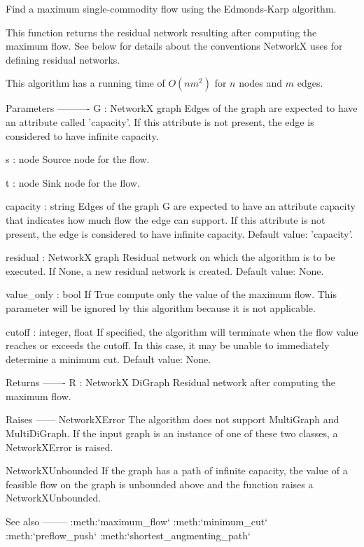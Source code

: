 \begin{DoxyVerb}Find a maximum single-commodity flow using the Edmonds-Karp algorithm.

This function returns the residual network resulting after computing
the maximum flow. See below for details about the conventions
NetworkX uses for defining residual networks.

This algorithm has a running time of $O(n m^2)$ for $n$ nodes and $m$
edges.


Parameters
----------
G : NetworkX graph
    Edges of the graph are expected to have an attribute called
    'capacity'. If this attribute is not present, the edge is
    considered to have infinite capacity.

s : node
    Source node for the flow.

t : node
    Sink node for the flow.

capacity : string
    Edges of the graph G are expected to have an attribute capacity
    that indicates how much flow the edge can support. If this
    attribute is not present, the edge is considered to have
    infinite capacity. Default value: 'capacity'.

residual : NetworkX graph
    Residual network on which the algorithm is to be executed. If None, a
    new residual network is created. Default value: None.

value_only : bool
    If True compute only the value of the maximum flow. This parameter
    will be ignored by this algorithm because it is not applicable.

cutoff : integer, float
    If specified, the algorithm will terminate when the flow value reaches
    or exceeds the cutoff. In this case, it may be unable to immediately
    determine a minimum cut. Default value: None.

Returns
-------
R : NetworkX DiGraph
    Residual network after computing the maximum flow.

Raises
------
NetworkXError
    The algorithm does not support MultiGraph and MultiDiGraph. If
    the input graph is an instance of one of these two classes, a
    NetworkXError is raised.

NetworkXUnbounded
    If the graph has a path of infinite capacity, the value of a
    feasible flow on the graph is unbounded above and the function
    raises a NetworkXUnbounded.

See also
--------
:meth:`maximum_flow`
:meth:`minimum_cut`
:meth:`preflow_push`
:meth:`shortest_augmenting_path`


\end{DoxyVerb}

